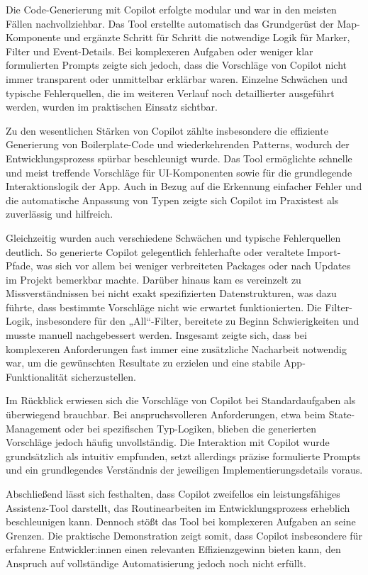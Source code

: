 Die Code-Generierung mit Copilot erfolgte modular und war in den meisten Fällen
nachvollziehbar. Das Tool erstellte automatisch das Grundgerüst der
Map-Komponente und ergänzte Schritt für Schritt die notwendige Logik für
Marker, Filter und Event-Details. Bei komplexeren Aufgaben oder weniger klar
formulierten Prompts zeigte sich jedoch, dass die Vorschläge von Copilot nicht
immer transparent oder unmittelbar erklärbar waren. Einzelne Schwächen und
typische Fehlerquellen, die im weiteren Verlauf noch detaillierter ausgeführt
werden, wurden im praktischen Einsatz sichtbar.

Zu den wesentlichen Stärken von Copilot zählte insbesondere die effiziente
Generierung von Boilerplate-Code und wiederkehrenden Patterns, wodurch der
Entwicklungsprozess spürbar beschleunigt wurde. Das Tool ermöglichte schnelle
und meist treffende Vorschläge für UI-Komponenten sowie für die grundlegende
Interaktionslogik der App. Auch in Bezug auf die Erkennung einfacher Fehler und
die automatische Anpassung von Typen zeigte sich Copilot im Praxistest als
zuverlässig und hilfreich.

Gleichzeitig wurden auch verschiedene Schwächen und typische Fehlerquellen
deutlich. So generierte Copilot gelegentlich fehlerhafte oder veraltete
Import-Pfade, was sich vor allem bei weniger verbreiteten Packages oder nach
Updates im Projekt bemerkbar machte. Darüber hinaus kam es vereinzelt zu
Missverständnissen bei nicht exakt spezifizierten Datenstrukturen, was dazu
führte, dass bestimmte Vorschläge nicht wie erwartet funktionierten. Die
Filter-Logik, insbesondere für den „All“-Filter, bereitete zu Beginn
Schwierigkeiten und musste manuell nachgebessert werden. Insgesamt zeigte sich,
dass bei komplexeren Anforderungen fast immer eine zusätzliche Nacharbeit
notwendig war, um die gewünschten Resultate zu erzielen und eine stabile
App-Funktionalität sicherzustellen.

Im Rückblick erwiesen sich die Vorschläge von Copilot bei Standardaufgaben als
überwiegend brauchbar. Bei anspruchsvolleren Anforderungen, etwa beim
State-Management oder bei spezifischen Typ-Logiken, blieben die generierten
Vorschläge jedoch häufig unvollständig. Die Interaktion mit Copilot wurde
grundsätzlich als intuitiv empfunden, setzt allerdings präzise formulierte
Prompts und ein grundlegendes Verständnis der jeweiligen
Implementierungsdetails voraus.

Abschließend lässt sich festhalten, dass Copilot zweifellos ein
leistungsfähiges Assistenz-Tool darstellt, das Routinearbeiten im
Entwicklungsprozess erheblich beschleunigen kann. Dennoch stößt das Tool bei
komplexeren Aufgaben an seine Grenzen. Die praktische Demonstration zeigt
somit, dass Copilot insbesondere für erfahrene Entwickler:innen einen
relevanten Effizienzgewinn bieten kann, den Anspruch auf vollständige
Automatisierung jedoch noch nicht erfüllt.

